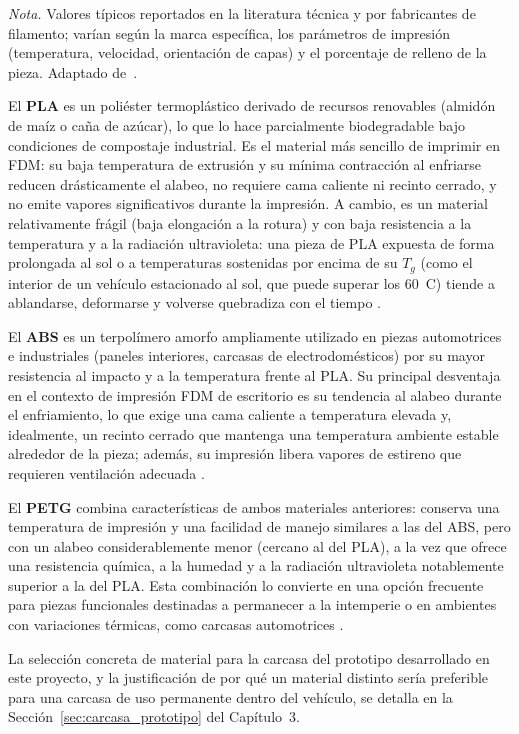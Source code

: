 \begin{table}[H]
	\begin{flushleft}
		\footnotesize \textit{Nota.} Valores típicos reportados en la literatura técnica y por fabricantes de filamento; varían según la marca específica, los parámetros de impresión (temperatura, velocidad, orientación de capas) y el porcentaje de relleno de la pieza. Adaptado de~\citep{Wevolver_PLAABSPETG2023, All3DP_PLAABSPETG2023}.
	\end{flushleft}
\end{table}

El \textbf{PLA} es un poliéster termoplástico derivado de recursos renovables (almidón de maíz o caña de azúcar), lo que lo hace parcialmente biodegradable bajo condiciones de compostaje industrial. Es el material más sencillo de imprimir en FDM: su baja temperatura de extrusión y su mínima contracción al enfriarse reducen drásticamente el alabeo, no requiere cama caliente ni recinto cerrado, y no emite vapores significativos durante la impresión. A cambio, es un material relativamente frágil (baja elongación a la rotura) y con baja resistencia a la temperatura y a la radiación ultravioleta: una pieza de PLA expuesta de forma prolongada al sol o a temperaturas sostenidas por encima de su $T_g$ (como el interior de un vehículo estacionado al sol, que puede superar los 60~\textdegree C) tiende a ablandarse, deformarse y volverse quebradiza con el tiempo \citep{Wevolver_PLAABSPETG2023, All3DP_PLAABSPETG2023}.

El \textbf{ABS} es un terpolímero amorfo ampliamente utilizado en piezas automotrices e industriales (paneles interiores, carcasas de electrodomésticos) por su mayor resistencia al impacto y a la temperatura frente al PLA. Su principal desventaja en el contexto de impresión FDM de escritorio es su tendencia al alabeo durante el enfriamiento, lo que exige una cama caliente a temperatura elevada y, idealmente, un recinto cerrado que mantenga una temperatura ambiente estable alrededor de la pieza; además, su impresión libera vapores de estireno que requieren ventilación adecuada \citep{Wevolver_PLAABSPETG2023}.

El \textbf{PETG} combina características de ambos materiales anteriores: conserva una temperatura de impresión y una facilidad de manejo similares a las del ABS, pero con un alabeo considerablemente menor (cercano al del PLA), a la vez que ofrece una resistencia química, a la humedad y a la radiación ultravioleta notablemente superior a la del PLA. Esta combinación lo convierte en una opción frecuente para piezas funcionales destinadas a permanecer a la intemperie o en ambientes con variaciones térmicas, como carcasas automotrices \citep{All3DP_PLAABSPETG2023}.

La selección concreta de material para la carcasa del prototipo desarrollado en este proyecto, y la justificación de por qué un material distinto sería preferible para una carcasa de uso permanente dentro del vehículo, se detalla en la Sección~\ref{sec:carcasa_prototipo} del Capítulo~3.

